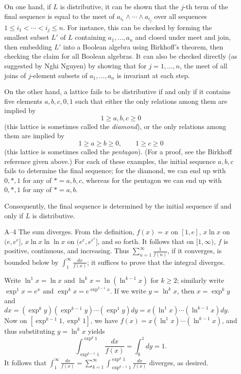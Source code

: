 \documentclass[amssymb,twocolumn,pra,10pt,aps]{revtex4-1}
\begin{document}
\begin{itemize}
On one hand, if $L$ is distributive, it can be shown that the $j$-th term
of the final sequence is equal to the meet of $a_{i_1} \wedge \cdots
\wedge a_{i_j}$ over all sequences $1 \leq i_1 < \cdots < i_j \leq n$.
For instance, this can be checked by forming the smallest subset $L'$
of $L$ containing $a_1,\dots,a_n$ and closed under meet and join,
then embedding $L'$ into a Boolean algebra using
Birkhoff's theorem, then checking the claim for all Boolean algebras.
It can also be checked directly (as suggested by Nghi Nguyen)
by showing that for $j=1,\dots,n$,
the meet of all joins of $j$-element subsets of $a_1,\dots,a_n$ is
invariant at each step.

On the other hand,
a lattice fails to be distributive if and only if
it contains five elements $a,b,c,0,1$ such that either the only relations
among them are implied by
\[
1 \geq a,b,c \geq 0
\]
(this lattice is sometimes called the \emph{diamond}),
or the only relations among them  are implied by
\[
1 \geq a \geq b \geq 0, \qquad 1 \geq c \geq 0
\]
(this lattice is sometimes called the \emph{pentagon}).
(For a proof, see the Birkhoff reference given above.) For each of these
examples, the initial sequence $a,b,c$ fails to determine the final
sequence; for the diamond, we can end up with $0, *, 1$ for
any of $* = a,b,c$, whereas for the pentagon we can end up with
$0, *, 1$ for any of $* = a, b$.

Consequently, the final sequence is determined by the initial sequence
if and only if $L$ is distributive.

\item[A--4]
The sum diverges. From the definition, $f(x) = x$ on $[1,e]$, $x\ln x$ on $(e,e^e]$, $x\ln x\ln\ln x$ on $(e^e,e^{e^e}]$, and so forth. It follows that on $[1,\infty)$, $f$ is positive, continuous, and increasing. Thus $\sum_{n=1}^\infty \frac{1}{f(n)}$, if it converges, is bounded below by $\int_1^{\infty} \frac{dx}{f(x)}$; it suffices to prove that the integral diverges.

Write $\ln^1 x  = \ln x $ and $\ln^k x = \ln(\ln^{k-1} x)$ for $k \geq 2$; similarly write $\exp^1 x = e^x$ and $\exp^k x  = e^{\exp^{k-1} x}$. If we write $y = \ln^k x$, then $x = \exp^k y$ and $dx = (\exp^ky)(\exp^{k-1}y)\cdots (\exp^1y)dy =
x(\ln^1 x) \cdots (\ln^{k-1}x)dy$. Now on
$[\exp^{k-1} 1,\exp^k 1]$, we have
$f(x) = x(\ln^1 x) \cdots (\ln^{k-1}x)$, and thus substituting $y=\ln^k x$ yields
\[
\int_{\exp^{k-1} 1}^{\exp^k 1} \frac{dx}{f(x)} =
\int_{0}^{1} dy = 1.
\]
It follows that $\int_1^{\infty} \frac{dx}{f(x)} = \sum_{k=1}^{\infty} \int_{\exp^{k-1} 1}^{\exp^k 1} \frac{dx}{f(x)}$ diverges, as desired.


\end{itemize}
\end{document}
